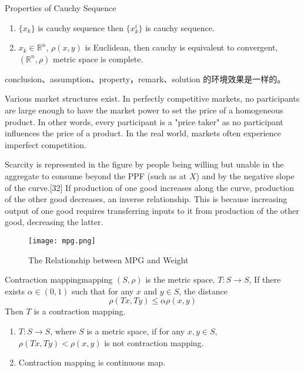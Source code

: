 \documentclass[titlestyle=hang,11pt]{elegantbook}
\begin{document}
\begin{property}
Properties of Cauchy Sequence
\begin{enumerate}[noitemsep]
\item $\{x_k\}$ is cauchy sequence then $\{x_k^i\}$ is cauchy sequence.
\item $x_k\in \mathbb{R}^n$, $\rho(x,y)$ is Euclidean, then cauchy is equivalent to convergent, $(\mathbb{R}^n,\rho)$ metric space is complete.
\end{enumerate}
\end{property}

\begin{note}
conclusion、assumption、property，remark、solution 的环境效果是一样的。
\end{note}

Various market structures exist. In perfectly competitive markets, no participants are large enough to have the market power to set the price of a homogeneous product. In other words, every participant is a "price taker" as no participant influences the price of a product. In the real world, markets often experience imperfect competition.

Scarcity is represented in the figure by people being willing but unable in the aggregate to consume beyond the PPF (such as at $X$) and by the negative slope of the curve.[32] If production of one good increases along the curve, production of the other good decreases, an inverse relationship. This is because increasing output of one good requires transferring inputs to it from production of the other good, decreasing the latter.

\begin{figure}[!htbp]
	\centering
	\texttt{[image: mpg.png]}
	\caption{The Relationship between MPG and Weight\label{fig:mpg}}
\end{figure}

\begin{definition}{Contraction mapping}{mapping}
$(S,\rho)$ is the metric space, $T: S\to S$, If there exists $\alpha\in(0,1)$ such that for any $x$ and $y\in S$, the distance
\begin{equation}
\rho(Tx,Ty)\leq \alpha\rho(x,y)
\end{equation}
Then $T$ is a {\color{main} contraction mapping}.
\end{definition}

\begin{remark}
\begin{enumerate}[noitemsep]
\item $T:S\to S$, where $S$ is a metric space, if  for any $x,y\in S$, $\rho(Tx,Ty)<\rho(x,y)$ is not contraction mapping.
\item Contraction mapping is continuous map.
\end{enumerate}
\end{remark}
\end{document}
